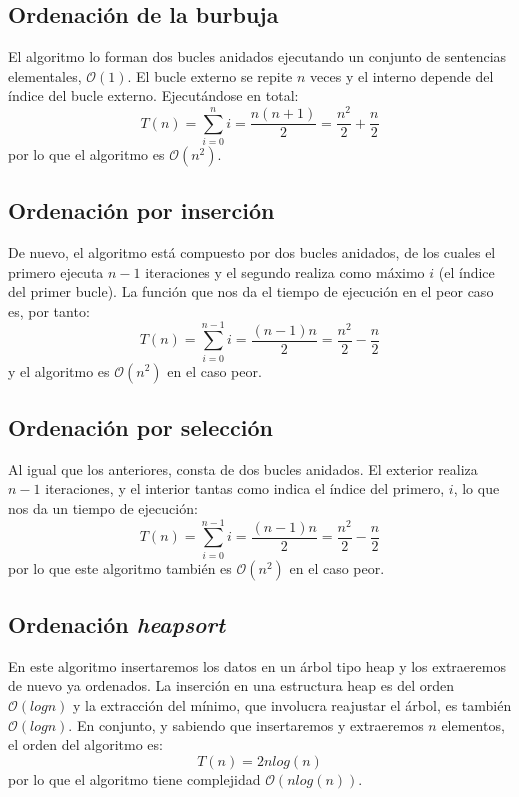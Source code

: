 \documentclass[a4paper, 11pt]{article} %
\begin{document}
\subsection {Ordenación de la burbuja}
El algoritmo lo forman dos bucles anidados ejecutando un conjunto de sentencias elementales, $\mathcal{O}(1)$.
El bucle externo se repite $n$ veces y el interno depende del índice del bucle externo. Ejecutándose en total:
\begin{equation}
 T(n) = \sum_{i=0}^n i = \frac{n(n+1)}{2} = \frac{n^2}{2} + \frac{n}{2}
\end{equation}
por lo que el algoritmo es $\mathcal{O}(n^2)$.

\subsection{Ordenación por inserción}
De nuevo, el algoritmo está compuesto por dos bucles anidados, de los cuales el primero ejecuta $n-1$ iteraciones y el segundo realiza como máximo $i$ (el índice del primer bucle). La función que nos da el tiempo de ejecución en el peor caso es, por tanto:
\begin{equation}
 T(n) = \sum_{i=0}^{n-1} i = \frac{(n-1)n}{2} = \frac{n^2}{2} - \frac{n}{2}
\end{equation}
y el algoritmo es $\mathcal{O}(n^2)$ en el caso peor.
\subsection{Ordenación por selección}
Al igual que los anteriores, consta de dos bucles anidados. El exterior realiza $n-1$ iteraciones, y el interior tantas como indica el índice del primero, $i$, lo que nos da un tiempo de ejecución:
\begin{equation}
 T(n) = \sum_{i=0}^{n-1} i = \frac{(n-1)n}{2} = \frac{n^2}{2} - \frac{n}{2}
\end{equation}
por lo que este algoritmo también es $\mathcal{O}(n^2)$ en el caso peor.

\subsection{Ordenación \textit{heapsort}}
En este algoritmo insertaremos los datos en un árbol tipo heap y los extraeremos de nuevo ya ordenados.
La inserción en una estructura heap es del orden $\mathcal{O}(log n)$ y la extracción del mínimo, que involucra
reajustar el árbol, es también $\mathcal{O}(log n)$. En conjunto, y sabiendo que insertaremos y extraeremos $n$ elementos,
el orden del algoritmo es:
\begin{equation}
 T(n) = 2 n log(n)
\end{equation}
por lo que el algoritmo tiene complejidad $\mathcal{O}(nlog(n))$.
\end{document}

